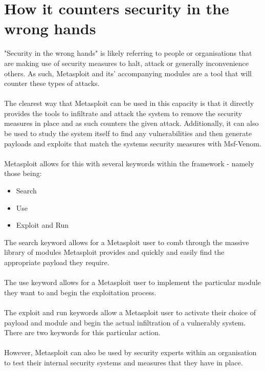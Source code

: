 \documentclass[a4paper, 12pt, titlepage]{report}
\begin{document}
\section{How it counters security in the wrong hands}
"Security in the wrong hands" is likely referring to people or organisations that are making use of security measures to halt, attack or generally inconvenience others. As such, Metasploit and its’ accompanying modules are a tool that will counter these types of attacks. 
\\\\
The clearest way that Metasploit can be used in this capacity is that it directly provides the tools to infiltrate and attack the system to remove the security measures in place and as such counters the given attack. Additionally, it can also be used to study the system itself to find any vulnerabilities and then generate payloads and exploits that match the systems security measures with Msf-Venom. 
\\\\
Metasploit allows for this with several keywords within the framework - namely those being:
\begin{itemize}
\item Search
\item Use
\item Exploit and Run
\end{itemize}
The search keyword allows for a Metasploit user to comb through the massive library of modules Metasploit provides and quickly and easily find the appropriate payload they require.\cite{goodDef}
\\\\
The use keyword allows for a Metasploit user to implement the particular module they want to and begin the exploitation process.\cite{goodDef}
\\\\
The exploit and run keywords allow a Metasploit user to activate their choice of payload and module and begin the actual infiltration of a vulnerably system. There are two keywords for this particular action.\cite{goodDef}
\\\\
However, Metasploit can also be used by security experts within an organisation to test their internal security systems and measures that they have in place.
\end{document}
